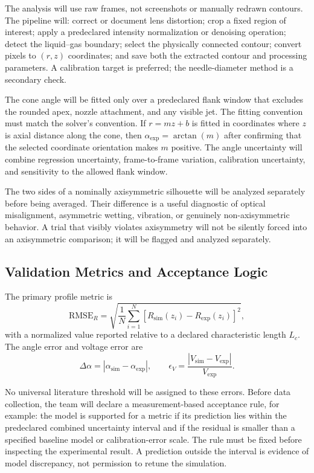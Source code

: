 The analysis will use raw frames, not screenshots or manually redrawn contours. The pipeline will: correct or document lens distortion; crop a fixed region of interest; apply a predeclared intensity normalization or denoising operation; detect the liquid--gas boundary; select the physically connected contour; convert pixels to $(r,z)$ coordinates; and save both the extracted contour and processing parameters. A calibration target is preferred; the needle-diameter method is a secondary check.

The cone angle will be fitted only over a predeclared flank window that excludes the rounded apex, nozzle attachment, and any visible jet. The fitting convention must match the solver's convention. If $r=mz+b$ is fitted in coordinates where $z$ is axial distance along the cone, then $\alpha_{\mathrm{exp}}=\arctan(m)$ after confirming that the selected coordinate orientation makes $m$ positive. The angle uncertainty will combine regression uncertainty, frame-to-frame variation, calibration uncertainty, and sensitivity to the allowed flank window.

The two sides of a nominally axisymmetric silhouette will be analyzed separately before being averaged. Their difference is a useful diagnostic of optical misalignment, asymmetric wetting, vibration, or genuinely non-axisymmetric behavior. A trial that visibly violates axisymmetry will not be silently forced into an axisymmetric comparison; it will be flagged and analyzed separately.

\subsection{Validation Metrics and Acceptance Logic}

The primary profile metric is
\begin{equation}
\mathrm{RMSE}_{R}=\sqrt{\frac{1}{N}\sum_{i=1}^{N}\left[R_{\mathrm{sim}}(z_i)-R_{\mathrm{exp}}(z_i)\right]^2},
\end{equation}
with a normalized value reported relative to a declared characteristic length $L_c$. The angle error and voltage error are
\begin{equation}
\Delta\alpha=\left|\alpha_{\mathrm{sim}}-\alpha_{\mathrm{exp}}\right|,
\qquad
\epsilon_V=\frac{\left|V_{\mathrm{sim}}-V_{\mathrm{exp}}\right|}{V_{\mathrm{exp}}}.
\end{equation}

No universal literature threshold will be assigned to these errors. Before data collection, the team will declare a measurement-based acceptance rule, for example: the model is supported for a metric if its prediction lies within the predeclared combined uncertainty interval and if the residual is smaller than a specified baseline model or calibration-error scale. The rule must be fixed before inspecting the experimental result. A prediction outside the interval is evidence of model discrepancy, not permission to retune the simulation.

